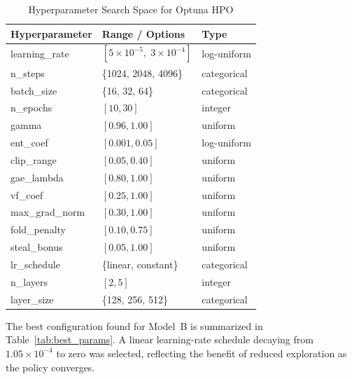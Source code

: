 \documentclass[conference]{IEEEtran}
\begin{document}
\begin{table}[htbp]
\centering
\caption{Hyperparameter Search Space for Optuna HPO}
\label{tab:hpo_space}
\begin{tabular}{|l|l|l|}
\hline
Hyperparameter & Range / Options & Type \\
\hline
learning\_rate      & $[5\times10^{-5},\;3\times10^{-4}]$ & log-uniform \\
n\_steps            & \{1024, 2048, 4096\}                 & categorical \\
batch\_size         & \{16, 32, 64\}                       & categorical \\
n\_epochs           & $[10, 30]$                           & integer \\
gamma               & $[0.96, 1.00]$                       & uniform \\
ent\_coef           & $[0.001, 0.05]$                      & log-uniform \\
clip\_range         & $[0.05, 0.40]$                       & uniform \\
gae\_lambda         & $[0.80, 1.00]$                       & uniform \\
vf\_coef            & $[0.25, 1.00]$                       & uniform \\
max\_grad\_norm     & $[0.30, 1.00]$                       & uniform \\
fold\_penalty       & $[0.10, 0.75]$                       & uniform \\
steal\_bonus        & $[0.05, 1.00]$                       & uniform \\
lr\_schedule        & \{linear, constant\}                 & categorical \\
n\_layers           & $[2, 5]$                             & integer \\
layer\_size         & \{128, 256, 512\}                    & categorical \\
\hline
\end{tabular}
\end{table}

The best configuration found for Model~B is summarized in
Table~\ref{tab:best_params}. A linear learning-rate schedule
decaying from $1.05\times10^{-4}$ to zero was selected, reflecting
the benefit of reduced exploration as the policy converges.
\end{document}
